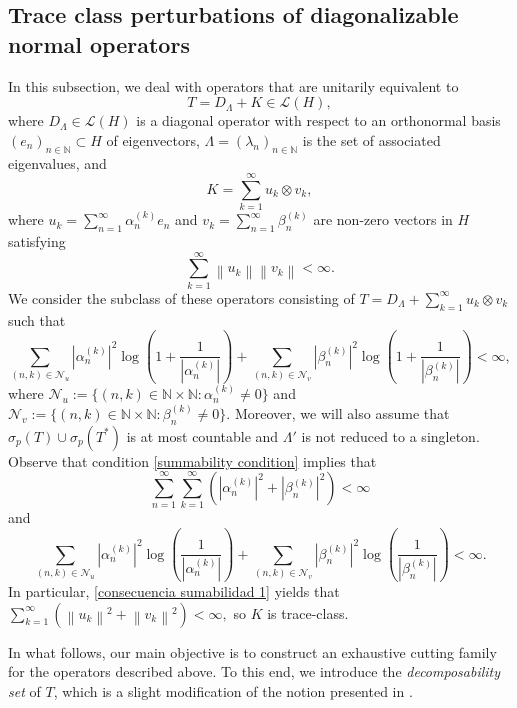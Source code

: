 \documentclass[11pt]{amsart}
\theoremstyle{definition}
\theoremstyle{remark}
\numberwithin{equation}{section}
\newcommand{\norm}[1]{\left\|#1\right\|}
\newcommand{\EL}{\mathcal{L}}
\newcommand{\N}{\mathbb{N}}
\newcommand{\al}{\alpha}
\newcommand{\sumn}{\sum_{n=1}^{\infty}}
\newcommand{\sumk}{\sum_{k=1}^{\infty}}
\begin{document}
\subsection{Trace class perturbations of diagonalizable normal operators}
In this subsection, we deal with  operators that are unitarily equivalent to
$$T=D_\Lambda + K\in \EL(H),$$
where $D_\Lambda \in \EL(H)$ is a diagonal operator with respect to an orthonormal basis $(e_n)_{n\in \N}\subset H$ of eigenvectors, $\Lambda = (\lambda_n)_{n\in \N}$ is the set of associated eigenvalues, and
$$ K =\sumk u_k\otimes v_k,$$ where $u_k = \sumn \al_n^{(k)}e_n$ and $v_k = \sumn \beta_n^{(k)}$ are non-zero vectors in $H$ satisfying
$$\sumk \norm{u_k}\norm{v_k} < \infty.$$
We consider the subclass of these operators consisting of $T=D_\Lambda + \sumk u_k\otimes v_k$ such that
\begin{equation}\label{summability condition}
			 \sum_{(n,k) \in \mathcal{N}_u} |\al_n^{(k)}|^2\log \left(1+\frac{1}{|\al_n^{(k)}|}\right) + \sum_{(n,k) \in \mathcal{N}_v}|\beta_n^{(k)}|^2\log\left(1+ \frac{1}{|\beta_n^{(k)}|}\right) < \infty,
			 \end{equation}
			 where $\mathcal{N}_u := \{(n,k) \in \N\times \N : \al_n^{(k)} \neq 0 \}$ and $\mathcal{N}_v := \{(n,k) \in \N\times \N : \beta_n^{(k)} \neq 0 \}$. Moreover, we will also assume that $\sigma_p(T)\cup \sigma_p(T^*)$ is at most countable and $\Lambda'$ is not reduced to a singleton. Observe that  condition \eqref{summability condition} implies that
\begin{equation}\label{consecuencia sumabilidad 1}
\sumn \sumk \left(|\al_n^{(k)}|^2 + |\beta_n^{(k)}|^2 \right) < \infty
\end{equation}
and
	\begin{equation}\label{consecuencia sumabilidad 2}
		\sum_{(n,k) \in \mathcal{N}_u} |\al_n^{(k)}|^2\log \left(\frac{1}{|\al_n^{(k)}|}\right) + \sum_{(n,k) \in \mathcal{N}_v}|\beta_n^{(k)}|^2\log\left( \frac{1}{|\beta_n^{(k)}|}\right) < \infty.
	\end{equation}
In particular, \eqref{consecuencia sumabilidad 1} yields that $\sumk (\norm{u_k}^2 + \norm{v_k}^2) < \infty,$ so $K$ is  trace-class.

\medskip

In what follows, our main objective is to construct an exhaustive cutting family for the operators described above. To this end, we introduce the \emph{decomposability set} of $T$, which is a slight modification of the notion presented in \cite{GG3}.
\end{document}
